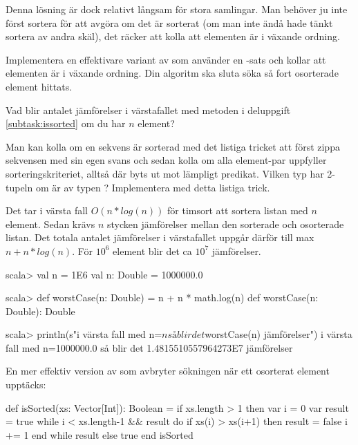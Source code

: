 Denna lösning är dock relativt långsam för stora samlingar. Man behöver ju inte först sortera  för att avgöra om det är sorterat (om man inte ändå hade tänkt sortera av andra skäl), det räcker att kolla att elementen är i växande ordning.

\Subtask\label{subtask:issorted} Implementera en effektivare variant av  som använder en -sats och kollar att elementen är i växande ordning. Din algoritm ska sluta söka så fort osorterade element hittats.

\Subtask\Pen Vad blir antalet jämförelser i värstafallet med metoden i deluppgift \ref{subtask:issorted} om du har $n$ element?


\Subtask \label{subtask:isSorted-zip} Man kan kolla om en sekvens är sorterad med det listiga tricket att först zippa sekvensen med sin egen svans och sedan kolla om alla element-par uppfyller sorteringskriteriet, alltså  där  byts ut mot lämpligt predikat. Vilken typ har 2-tupeln  om  är av typen ? Implementera  med detta listiga trick. 

\SOLUTION


\TaskSolved \what



\SubtaskSolved Det tar i värsta fall $O(n*log(n))$ för timsort att sortera listan med $n$ element. Sedan krävs $n$ stycken jämförelser mellan den sorterade och osorterade listan. Det totala antalet jämförelser i värstafallet uppgår därför till max $n + n*log(n)$. För $10^6$ element blir det ca $10^7$ jämförelser.
\begin{REPLnonum}
scala> val n = 1E6
val n: Double = 1000000.0

scala> def worstCase(n: Double) = n + n * math.log(n)
def worstCase(n: Double): Double

scala> println(s"i värsta fall med n=$n så blir det ${worstCase(n)} jämförelser")
i värsta fall med n=1000000.0 så blir det 1.4815510557964273E7 jämförelser
\end{REPLnonum}

\SubtaskSolved En mer effektiv version av  som avbryter sökningen när ett osorterat element upptäcks:
\begin{Code}
def isSorted(xs: Vector[Int]): Boolean = 
  if xs.length > 1 then
    var i = 0
    var result = true
    while i < xs.length-1 && result do 
      if xs(i) > xs(i+1) then result = false
      i += 1
    end while
    result
  else true
end isSorted
\end{Code}

